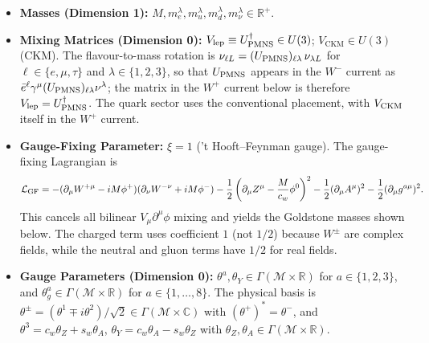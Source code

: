 \documentclass{article}
\begin{document}
\begin{itemize}
    $f^{abc}$ are the SU(3) structure constants, typed as $f: \{1,\dots,8\}^3 \to \mathbb{R}$;
    $T^a$ are the SU(3) generators, typed as $T: \{1,\dots,8\} \to \operatorname{End}(\mathbb{C}^3)$, with $\mathrm{tr}(T^a T^b) = \frac{1}{2}\delta^{ab}$; these are Hermitian, so $T^a \in i\,\mathfrak{su}(3)$ and the Lie-algebra-valued gluon field is $i g_\mu^a T^a \in \Gamma(T^*\mathcal M \otimes \mathfrak{su}(3))$;
    $T_L^a \equiv \tau^a/2$ are the SU(2)$_L$ generators, where $\tau^a$ are the Pauli matrices, typed as $T_L : \{1,2,3\} \to \operatorname{End}(\mathbb{C}^2)$, with $\mathrm{tr}(T_L^a T_L^b) = \frac{1}{2}\delta^{ab}$;
    $\alpha_h \in \mathbb{R}_{>0}$ (dimension 0, positive for stable vacuum); $\beta_h = 0$ (tree‑level counterterm, set to zero to preserve the stated Goldstone masses and avoid a tadpole).
    \item \textbf{Masses (Dimension 1):} 
    $M, m_e^\lambda, m_u^\lambda, m_d^\lambda, m_\nu^\lambda \in \mathbb{R}^+$.
    \item \textbf{Mixing Matrices (Dimension 0):} 
    $V_{\text{lep}} \equiv U_{\rm PMNS}^\dagger \in U(3)$; $V_{\text{CKM}} \in U(3)$ (CKM). The flavour-to-mass rotation is $\nu_{\ell L} = (U_{\rm PMNS})_{\ell\lambda}\,\nu_{\lambda L}$ for $\ell \in \{e,\mu,\tau\}$ and $\lambda \in \{1,2,3\}$, so that $U_{\rm PMNS}$ appears in the $W^-$ current as $\bar e^\ell \gamma^\mu (U_{\rm PMNS})_{\ell\lambda} \nu^\lambda$; the matrix in the $W^+$ current below is therefore $V_{\rm lep} = U_{\rm PMNS}^\dagger$. The quark sector uses the conventional placement, with $V_{\rm CKM}$ itself in the $W^+$ current.
    \item \textbf{Gauge-Fixing Parameter:} $\xi = 1$ ('t Hooft--Feynman gauge). 
    The gauge-fixing Lagrangian is
    \[
    \mathcal{L}_{\rm GF} =
    -(\partial_\mu W^{+\mu} - i M\phi^+)(\partial_\nu W^{-\nu} + i M\phi^-)
    -\frac12\left(\partial_\mu Z^\mu-\frac{M}{c_w}\phi^0\right)^2
    -\frac12(\partial_\mu A^\mu)^2
    -\frac12(\partial_\mu g^{a\mu})^2 .
    \]
    This cancels all bilinear $V_\mu\partial^\mu\phi$ mixing and yields the Goldstone masses shown below. The charged term uses coefficient $1$ (not $1/2$) because $W^\pm$ are complex fields, while the neutral and gluon terms have $1/2$ for real fields.
    \item \textbf{Gauge Parameters (Dimension 0):}
    $\theta^a, \theta_Y \in \Gamma(\mathcal M\times\mathbb R)$ for $a\in\{1,2,3\}$, and $\theta_g^a \in \Gamma(\mathcal M\times\mathbb R)$ for $a\in\{1,\dots,8\}$.
    The physical basis is $\theta^\pm = (\theta^1 \mp i\theta^2)/\sqrt2 \in \Gamma(\mathcal M\times\mathbb C)$ with $(\theta^+)^* = \theta^-$, and $\theta^3 = c_w\theta_Z + s_w\theta_A$, $\theta_Y = c_w\theta_A - s_w\theta_Z$ with $\theta_Z,\theta_A \in \Gamma(\mathcal M\times\mathbb R)$.

\end{itemize}
\end{document}
